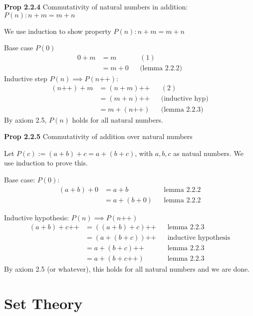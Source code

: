 \documentclass[answers,12pt]{exam}
\newcommand{\increment}{\text{++}}
\begin{document}
\textbf{Prop 2.2.4} Commutativity of natural numbers in addition: $P(n): n+m = m+n$

\begin{solution}
    We use induction to show property $P(n): n + m = m + n$

    Base case $P(0)$
    \begin{align*}
        0+m &= m && (1) \\
        &= m+0 && \text{(lemma 2.2.2)}
    \end{align*}
    Inductive step $P(n) \implies P(n\increment)$:
    \begin{align*}
        (n \increment) + m &= (n+m) \increment && (2) \\
        &= (m+n) \increment && \text{(inductive hyp)} \\
        &= m+ (n \increment) && \text{(lemma 2.2.3)}
    \end{align*}
    By axiom 2.5, $P(n)$ holds for all natural numbers.
\end{solution}

\textbf{Prop 2.2.5} Commutativity of addition over natural numbers

\begin{solution}
    Let $P(c):= (a+b)+c = a+(b+c)$, with $a,b,c$ as natual numbers.
    We use induction to prove this.
    
    Base case: $P(0)$:
    \begin{align*}
        (a+b)+0 &= a+b && \text{lemma 2.2.2}\\
        &= a+(b+0) && \text{lemma 2.2.2}
    \end{align*}

    Inductive hypothesis: $P(n) \implies P(n \increment)$
    \begin{align*}
        (a+b)+ c \increment &= ((a+b)+c) \increment && \text{lemma 2.2.3} \\
        &=(a+(b+c))\increment && \text{inductive hypothesis} \\
        &= a + (b+c) \increment && \text{lemma 2.2.3} \\
        &= a+(b+c \increment) && \text{lemma 2.2.3}
    \end{align*}
    By axiom 2.5 (or whatever), this holds for all natural numbers and we are done.
\end{solution}

\section{Set Theory}
\end{document}
